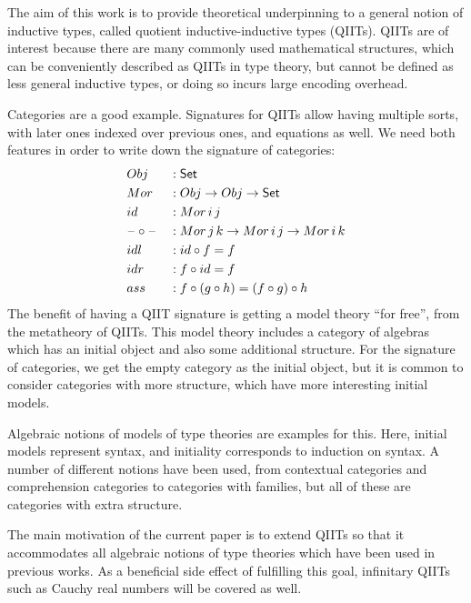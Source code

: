 \documentclass{llncs}
\begin{document}

The aim of this work is to provide theoretical underpinning to a general notion
of inductive types, called quotient inductive-inductive types (QIITs). QIITs are
of interest because there are many commonly used mathematical structures, which
can be conveniently described as QIITs in type theory, but cannot be defined as
less general inductive types, or doing so incurs large encoding overhead.

Categories are a good example. Signatures for QIITs allow having multiple sorts,
with later ones indexed over previous ones, and equations as well. We need both
features in order to write down the signature of categories:
\begin{alignat*}{3}
  & Obj && : \mathsf{Set} \\
  & Mor && : Obj \rightarrow Obj \rightarrow \mathsf{Set} \\
  & id  && : Mor\,i\,j \\
  & \mathord{\hspace{1pt}\text{--}\hspace{1pt}}\circ\mathord{\hspace{1pt}\text{--}\hspace{1pt}} && : Mor\,j\,k\rightarrow Mor\,i\,j \rightarrow Mor\,i\,k \\
  & idl && : id \circ f = f \\
  & idr && : f \circ id = f \\
  & ass && : f \circ (g \circ h) = (f \circ g) \circ h
\end{alignat*}
The benefit of having a QIIT signature is getting a model theory ``for free'',
from the metatheory of QIITs. This model theory includes a category of algebras
which has an initial object and also some additional structure. For the
signature of categories, we get the empty category as the initial object, but it
is common to consider categories with more structure, which have more
interesting initial models.

Algebraic notions of models of type theories are examples for this. Here,
initial models represent syntax, and initiality corresponds to induction on
syntax. A number of different notions have been used, from contextual categories
and comprehension categories to categories with families, but all of these are
categories with extra structure.

The main motivation of the current paper is to extend QIITs so that it
accommodates all algebraic notions of type theories which have been used in
previous works. As a beneficial side effect of fulfilling this goal, infinitary
QIITs such as Cauchy real numbers will be covered as well.
\end{document}

